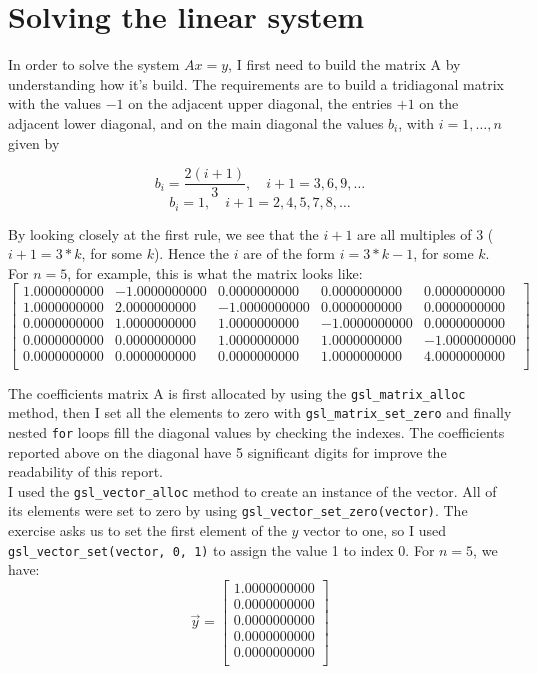 \documentclass{article}
\newcommand{\code}{\texttt}
\begin{document}
\section{Solving the linear system}
In order to solve the system $Ax=y$, I first need to build the matrix A by understanding how it's build. The requirements are to build a tridiagonal matrix with the values $-1$ on the adjacent upper diagonal, the entries $+1$ on the adjacent lower diagonal, and on the main diagonal the values $b_{i}$, with $i = 1, \ldots, n$ given by

$$b_i =\frac{2(i+1)}{3},\quad i + 1= 3, 6, 9,\ldots$$
$$b_i =1,\quad i + 1 = 2, 4, 5, 7, 8, \ldots$$

By looking closely at the first rule, we see that the $i+1$ are all multiples of 3 ($i+1 = 3*k$, for some $k$). Hence the $i$ are of the form $i = 3*k-1$, for some $k$. For $n = 5$, for example, this is what the matrix looks like:
$$
\begin{bmatrix}
1.0000000000 & -1.0000000000 & 0.0000000000 & 0.0000000000 & 0.0000000000 \\
1.0000000000 & 2.0000000000 & -1.0000000000 & 0.0000000000 & 0.0000000000 \\
0.0000000000 & 1.0000000000 & 1.0000000000 & -1.0000000000 & 0.0000000000 \\ 
0.0000000000 & 0.0000000000 & 1.0000000000 & 1.0000000000 & -1.0000000000 \\ 
0.0000000000 & 0.0000000000 & 0.0000000000 & 1.0000000000 & 4.0000000000 \\\end{bmatrix}
$$

The coefficients matrix A is first allocated by using the \code{gsl\_matrix\_alloc} method, then I set all the elements to zero with \code{gsl\_matrix\_set\_zero} and finally nested \code{for} loops fill the diagonal values by checking the indexes. The coefficients reported above on the diagonal have 5 significant digits for improve the readability of this report.\\

I used the \code{gsl\_vector\_alloc} method to create an instance of the vector. All of its elements were set to zero by using \code{gsl\_vector\_set\_zero(vector)}. The exercise asks us to set the first element of the $y$ vector to one, so I used \code{gsl\_vector\_set(vector, 0, 1)} to assign the value 1 to index 0. For $n=5$, we have:
$$
\vec{y}=
\begin{bmatrix}
1.0000000000 \\
0.0000000000 \\
0.0000000000 \\
0.0000000000 \\
0.0000000000 \\
\end{bmatrix}
$$
\end{document}
